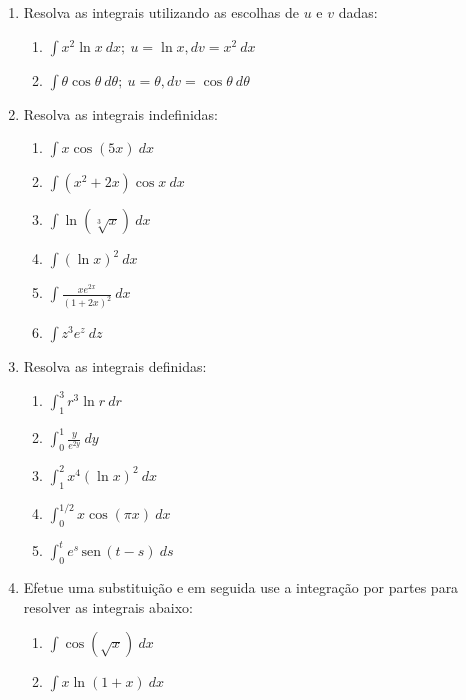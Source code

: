 \documentclass[a4paper,5pt]{amsbook}
\newcommand{\sen}{\,\mbox{sen}\,}
\newcommand{\ds}{\displaystyle}
\begin{document}
\vspace{1cm}
\begin{enumerate}
	\vspace{0.5cm}
	\item Resolva as integrais utilizando as escolhas de $u$ e $v$ dadas:
		\begin{enumerate}
			\item $\ds\int x^2\ln{x}\ dx;\ u=\ln{x}, dv=x^2\ dx$
			\item $\ds\int \theta \cos{\theta}\ d\theta;\ u=\theta,
				dv=\cos{\theta}\ d\theta$
		\end{enumerate}

	\vspace{0.5cm}
	\item Resolva as integrais indefinidas:
		\begin{enumerate}
			\item $\ds\int x\cos(5x)\ dx$
			\item $\ds\int (x^2+2x)\cos{x}\ dx$
			\item $\ds\int \ln(\sqrt[3]{x})\ dx$
			\item $\ds\int {(\ln{x})}^2\ dx$
			\item $\ds\int \frac{xe^{2x}}{{(1+2x)}^2}\ dx$
			\item $\ds\int z^3e^z\ dz$
		\end{enumerate}
	
	\vspace{0.5cm}
	\item Resolva as integrais definidas:
		\begin{enumerate}
			\item $\ds\int_1^3 r^3\ln{r}\ dr$
			\item $\ds\int_0^1 \frac{y}{e^{2y}}\ dy$
			\item $\ds\int_1^2x^4{(\ln{x})}^2\ dx$
			\item $\ds\int_0^{1/2} x \cos(\pi x)\ dx$
			\item $\ds\int_0^t e^s \sen(t-s)\ ds$
		\end{enumerate}

	\vspace{0.5cm}
	\item Efetue uma substitui\c{c}\~ao e em seguida use a integra\c{c}\~ao por partes para
		resolver as integrais abaixo:
		\begin{enumerate}
			\item $\ds\int \cos(\sqrt{x})\ dx$
			\item $\ds\int x \ln(1+x)\ dx$
		\end{enumerate}

\end{enumerate}
\end{document}
